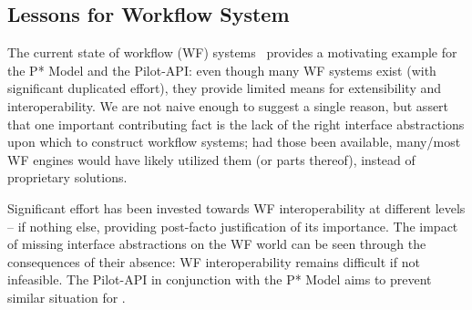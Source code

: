 \documentclass{sig-alternate}
\begin{document}
\subsection{Lessons for Workflow System}

The current state of workflow (WF) systems~\cite{nsf-workflow,1196459}
provides a motivating example for the P* Model and the Pilot-API: even
though many WF systems exist (with significant duplicated effort),
they provide limited means for extensibility and interoperability.  We
are not naive enough to suggest a single reason, but assert that one
important contributing fact is the lack of the right interface
abstractions upon which to construct workflow systems; had those been
available, many/most WF engines would have likely utilized them (or
parts thereof), instead of proprietary solutions.


Significant effort has been invested towards WF interoperability at
different levels -- if nothing else, providing post-facto
justification of its importance. The impact of missing interface
abstractions on the WF world can be seen through the consequences of
their absence: WF interoperability remains difficult if not
infeasible. The Pilot-API in conjunction with the P* Model aims to
prevent similar situation for \pilotjobs.




\end{document}
